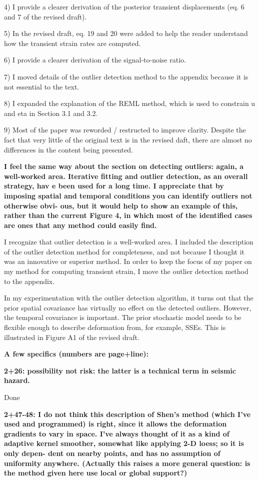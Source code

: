 \documentclass[10pt,a4paper]{letter}
\begin{document}
\begin{letter}{}
  4) I provide a clearer derivation of the posterior transient
     displacements (eq. 6 and 7 of the revised draft). 
  
  5) In the revised draft, eq. 19 and 20 were added to help the reader
     understand how the transient strain rates are computed.

  6) I provide a clearer derivation of the signal-to-noise ratio.
  
  7) I moved details of the outlier detection method to the appendix
     because it is not essential to the text.

  8) I expanded the explanation of the REML method, which is used to
     constrain u and eta in Section 3.1 and 3.2.

  9) Most of the paper was reworded / restructed to improve
     clarity. Despite the fact that very little of the original text
     is in the revised daft, there are almost no differences in the
     content being presented.
 

\textbf{I feel the same way about the section on detecting outliers: again, a
well-worked area. Iterative fitting and outlier detection, as an
overall strategy, hav e been used for a long time. I appreciate that
by imposing spatial and temporal conditions you can identify outliers
not otherwise obvi- ous, but it would help to show an example of this,
rather than the current Figure 4, in which most of the identified
cases are ones that any method could easily find.}

I recognize that outlier detection is a well-worked area. I included
the description of the outlier detection method for completeness, and
not because I thought it was an innovative or superior method. In
order to keep the focus of my paper on my method for computing
transient strain, I move the outlier detection method to the appendix.

In my experimentation with the outlier detection algorithm, it turns
out that the prior spatial covariance has virtually no effect on the
detected outliers. However, the temporal covariance is important. The
prior stochastic model needs to be flexible enough to describe
deformation from, for example, SSEs. This is illustrated in Figure A1
of the revised draft.

\textbf{A few specifics (numbers are page+line):}

\textbf{2+26: possibility not risk: the latter is a technical term in seismic
hazard.}

Done

\textbf{2+47-48: I do not think this description of Shen’s method (which I’ve
used and programmed) is right, since it allows the deformation
gradients to vary in space. I’ve always thought of it as a kind of
adaptive kernel smoother, somewhat like applying 2-D loess; so it is
only depen- dent on nearby points, and has no assumption of uniformity
anywhere. (Actually this raises a more general question: is the method
given here use local or global support?)}


\end{letter}
\end{document}
